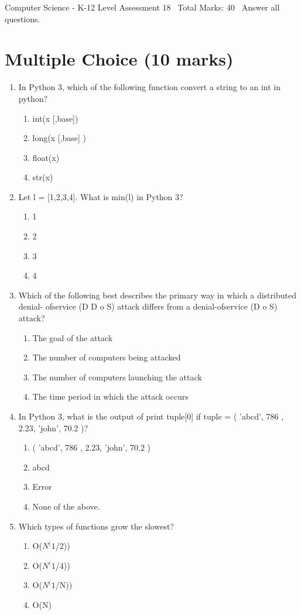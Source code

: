 \documentclass[12pt]{article}
\begin{document}
\begin{center}
Computer Science - K-12 Level Assessment 18 \
Total Marks: 40 \
Answer all questions.
\end{center}

\section*{Multiple Choice (10 marks)}
\begin{enumerate}[label=\arabic*.]
\item In Python 3, which of the following function convert a string to an int in python?
\begin{enumerate}[label=(\alph*)]
    \item int(x [,base])
    \item long(x [,base] )
    \item float(x)
    \item str(x)
\end{enumerate}
\item Let l = [1,2,3,4]. What is min(l) in Python 3?
\begin{enumerate}[label=(\alph*)]
    \item 1
    \item 2
    \item 3
    \item 4
\end{enumerate}
\item Which of the following best describes the primary way in which a distributed denial- ofservice (D D o S) attack differs from a denial-ofservice (D o S) attack?
\begin{enumerate}[label=(\alph*)]
    \item The goal of the attack
    \item The number of computers being attacked
    \item The number of computers launching the attack
    \item The time period in which the attack occurs
\end{enumerate}
\item In Python 3, what is the output of print tuple[0] if tuple = ( 'abcd', 786 , 2.23, 'john', 70.2 )?
\begin{enumerate}[label=(\alph*)]
    \item ( 'abcd', 786 , 2.23, 'john', 70.2 )
    \item abcd
    \item Error
    \item None of the above.
\end{enumerate}
\item Which types of functions grow the slowest?
\begin{enumerate}[label=(\alph*)]
    \item O($N^(1$/2))
    \item O($N^(1$/4))
    \item O($N^(1$/N))
    \item O(N)
\end{enumerate}
\end{enumerate}
\end{document}
